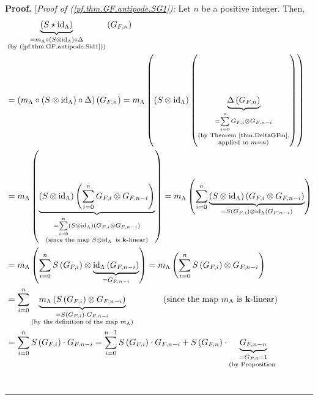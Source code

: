 \documentclass[numbers=enddot,12pt,final,onecolumn,notitlepage]{scrartcl}%
\theoremstyle{definition}
\newenvironment{proof}[1][Proof]{\noindent\textbf{#1.} }{\ \rule{0.5em}{0.5em}}
\let\sumnonlimits\sum
\renewcommand{\sum}{\sumnonlimits\limits}
\newenvironment{verlong}{}{}
\begin{document}
\begin{verlong}
\begin{proof}
[\textit{Proof of (\ref{pf.thm.GF.antipode.SG1}):} Let $n$ be a positive
integer. Then,
\begin{align*}
&  \underbrace{\left(  S\star\operatorname*{id}\nolimits_{\Lambda}\right)
}_{\substack{=m_{\Lambda}\circ\left(  S\otimes\operatorname*{id}%
\nolimits_{\Lambda}\right)  \circ\Delta\\\text{(by
(\ref{pf.thm.GF.antipode.Sid1}))}}}\left(  G_{F,n}\right) \\
&  =\left(  m_{\Lambda}\circ\left(  S\otimes\operatorname*{id}%
\nolimits_{\Lambda}\right)  \circ\Delta\right)  \left(  G_{F,n}\right)
=m_{\Lambda}\left(  \left(  S\otimes\operatorname*{id}\nolimits_{\Lambda
}\right)  \left(  \underbrace{\Delta\left(  G_{F,n}\right)  }_{\substack{=\sum
_{i=0}^{n}G_{F,i}\otimes G_{F,n-i}\\\text{(by Theorem \ref{thm.DeltaGFm}%
,}\\\text{applied to }m=n\text{)}}}\right)  \right) \\
&  =m_{\Lambda}\left(  \underbrace{\left(  S\otimes\operatorname*{id}%
\nolimits_{\Lambda}\right)  \left(  \sum_{i=0}^{n}G_{F,i}\otimes
G_{F,n-i}\right)  }_{\substack{=\sum_{i=0}^{n}\left(  S\otimes
\operatorname*{id}\nolimits_{\Lambda}\right)  \left(  G_{F,i}\otimes
G_{F,n-i}\right)  \\\text{(since the map }S\otimes\operatorname*{id}%
\nolimits_{\Lambda}\text{ is }\mathbf{k}\text{-linear)}}}\right)  =m_{\Lambda
}\left(  \sum_{i=0}^{n}\underbrace{\left(  S\otimes\operatorname*{id}%
\nolimits_{\Lambda}\right)  \left(  G_{F,i}\otimes G_{F,n-i}\right)
}_{=S\left(  G_{F,i}\right)  \otimes\operatorname*{id}\nolimits_{\Lambda
}\left(  G_{F,n-i}\right)  }\right) \\
&  =m_{\Lambda}\left(  \sum_{i=0}^{n}S\left(  G_{F,i}\right)  \otimes
\underbrace{\operatorname*{id}\nolimits_{\Lambda}\left(  G_{F,n-i}\right)
}_{=G_{F,n-i}}\right)  =m_{\Lambda}\left(  \sum_{i=0}^{n}S\left(
G_{F,i}\right)  \otimes G_{F,n-i}\right) \\
&  =\sum_{i=0}^{n}\underbrace{m_{\Lambda}\left(  S\left(  G_{F,i}\right)
\otimes G_{F,n-i}\right)  }_{\substack{=S\left(  G_{F,i}\right)  \cdot
G_{F,n-i}\\\text{(by the definition of the map }m_{\Lambda}\text{)}%
}}\ \ \ \ \ \ \ \ \ \ \left(  \text{since the map }m_{\Lambda}\text{ is
}\mathbf{k}\text{-linear}\right) \\
&  =\sum_{i=0}^{n}S\left(  G_{F,i}\right)  \cdot G_{F,n-i}=\sum_{i=0}%
^{n-1}S\left(  G_{F,i}\right)  \cdot G_{F,n-i}+S\left(  G_{F,n}\right)
\cdot\underbrace{G_{F,n-n}}_{\substack{=G_{F,0}=1\\\text{(by Proposition
}}}
\end{align*}
\end{proof}
\end{verlong}
\end{document}
